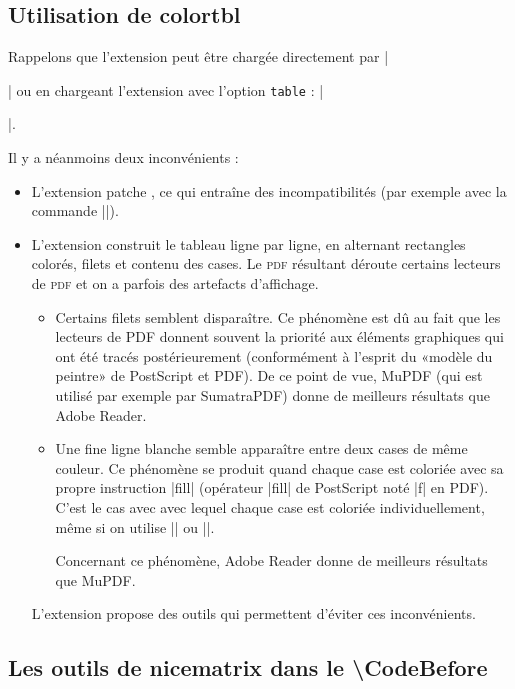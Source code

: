\documentclass[dvipsnames]{article}%
\begin{document}

\subsection{Utilisation de colortbl}


Rappelons que l'extension  peut être chargée directement par
|\usepackage{colortbl}| ou en chargeant l'extension  avec l'option
\texttt{table} : |\usepackage[table]{xcolor}|.

\medskip
Il y a néanmoins deux inconvénients :
\begin{itemize}
\item L'extension  patche , ce qui entraîne des
incompatibilités (par exemple avec la commande |\hdotsfor|).

\item L'extension  construit le tableau ligne par ligne, en
alternant rectangles colorés, filets et contenu des cases. Le \textsc{pdf}
résultant déroute certains lecteurs de \textsc{pdf} et on a parfois des artefacts
d'affichage.

\begin{itemize}
\item Certains filets semblent disparaître. Ce phénomène est dû au fait que les
lecteurs de PDF donnent souvent la priorité aux éléments graphiques qui ont été
tracés postérieurement (conformément à l'esprit du «modèle du peintre» de
PostScript et PDF). De ce point de vue, MuPDF (qui est utilisé par exemple par
SumatraPDF) donne de meilleurs résultats que Adobe Reader.

\item Une fine ligne blanche semble apparaître entre deux cases de même
couleur. Ce phénomène se produit quand chaque case est coloriée avec sa
propre instruction |fill| (opérateur |fill| de PostScript noté |f| en PDF).
C'est le cas avec  avec lequel chaque case est coloriée
individuellement, même si on utilise |\columncolor| ou |\rowcolor|.

Concernant ce phénomène, Adobe Reader donne de meilleurs résultats que
MuPDF.
\end{itemize}

L'extension  propose des outils qui permettent d'éviter ces
inconvénients.
\end{itemize}

\subsection{Les outils de nicematrix dans le \textbackslash CodeBefore}
\end{document}
